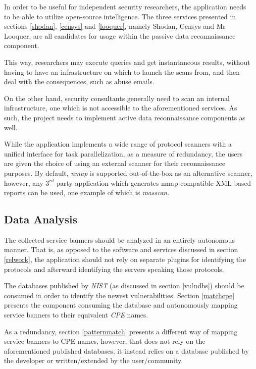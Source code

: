 \documentclass[a4paper,12pt]{article}
\begin{document}
	In order to be useful for independent security researchers, the application needs to be able to utilize open-source intelligence. The three services presented in sections \ref{shodan}, \ref{censys} and \ref{looquer}, namely Shodan\cite{shodan16}, Censys\cite{censys15} and Mr Looquer\cite{looquer16}, are all candidates for usage within the passive data reconnaissance component.
	
	This way, researchers may execute queries and get instantaneous results, without having to have an infrastructure on which to launch the scans from, and then deal with the consequences, such as abuse emails.
	
	On the other hand, security consultants generally need to scan an internal infrastructure, one which is not accessible to the aforementioned services. As such, the project needs to implement active data reconnaissance components as well.
	
	While the application implements a wide range of protocol scanners with a unified interface for task parallelization, as a measure of redundancy, the users are given the choice of using an external scanner for their reconnaissance purposes. By default, \textit{nmap} is supported out-of-the-box as an alternative scanner, however, any $3^{rd}$-party application which generates nmap-compatible XML-based reports can be used, one example of which is \textit{masscan}.
		
\subsection{Data Analysis}
 
	
	The collected service banners should be analyzed in an entirely autonomous manner. That is, as opposed to the software and services discussed in section \ref{relwork}, the application should not rely on separate plugins for identifying the protocols and afterward identifying the servers speaking those protocols.
	
	The databases published by \textit{NIST} (as discussed in section \ref{vulndbs}) should be consumed in order to identify the newest vulnerabilities. Section \ref{matchcpe} presents the component consuming the database and autonomously mapping service banners to their equivalent \textit{CPE} names.
	
	As a redundancy, section \ref{patternmatch} presents a different way of mapping service banners to CPE names, however, that does not rely on the aforementioned published databases, it instead relies on a database published by the developer or written/extended by the user/community.
			
\end{document}

